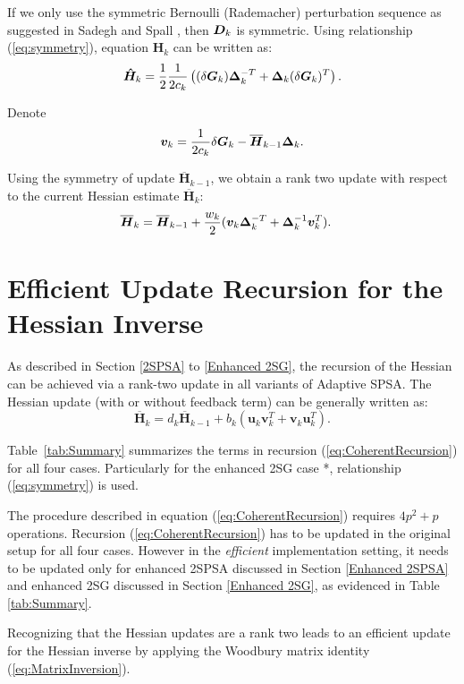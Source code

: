 \documentclass[conference]{IEEEtran} \ifCLASSINFOpdf
\newcommand{\oH}{\bm{\overline{H}}}
\newcommand{\hH}{\bm{\hat{H}}} \newcommand{\hPsi}{\bm{\hat{\Psi}}}
\begin{document}
If we only use the symmetric Bernoulli (Rademacher)
perturbation sequence as suggested in Sadegh and Spall
\cite{Sadegh1998}, then $\bm{D}_k$ is symmetric. Using relationship
(\ref{eq:symmetry}), equation $\hH_k$ can be written as:
\begin{equation}
\hH_k=\frac{1}{2}\frac{1}{2c_k}\left( (\delta\bG_k)\bDelta_k^{-T}+\bDelta_k(\delta\bG_k)^{T} \right).
\end{equation}

Denote
\begin{equation}
\bm{v}_k= \frac{1}{2c_k}\delta\bG_k-\oH_{k-1}\bDelta_k.
\end{equation}

Using the symmetry of update $\oH_{k-1}$, we obtain a rank two
update with respect to the current Hessian estimate $\oH_k$:
\begin{align*}
 \oH_k&=\oH_{k-1}+\frac{w_k}{2} (\bm{v}_k\bDelta_k^{-T}+\bDelta_k^{-1}\bm{v}_k^{T}).
\end{align*}


\section{Efficient Update Recursion for the Hessian Inverse}
As described in Section \ref{2SPSA} to \ref{Enhanced 2SG}, the
recursion of the Hessian can be achieved via a rank-two update in all
variants of Adaptive SPSA.  The Hessian update (with or without
feedback term) can be generally written as:
\begin{equation}
\label{eq:CoherentRecursion}
  \oH_{k}=d_k\oH_{k-1}+b_k(\bm{u}_k \bm{v}_k^{T}+\bm{v}_k \bm{u}_k^{T}).
\end{equation}

Table~\ref{tab:Summary} summarizes the terms in recursion
(\ref{eq:CoherentRecursion}) for all four cases. Particularly for the
enhanced 2SG case *, relationship (\ref{eq:symmetry}) is used.

The procedure described in equation
(\ref{eq:CoherentRecursion}) requires $4p^2 + p$ operations. Recursion
(\ref{eq:CoherentRecursion}) has to be updated in the original setup
for all four cases. However in the \textit{efficient} implementation
setting, it needs to be updated only for enhanced 2SPSA discussed in
Section \ref{Enhanced 2SPSA} and enhanced 2SG discussed in Section
\ref{Enhanced 2SG}, as evidenced in Table \ref{tab:Summary}.

Recognizing that the Hessian updates are a rank two leads to
an efficient update for the Hessian inverse by applying the Woodbury
matrix identity (\ref{eq:MatrixInversion}).
\end{document}

